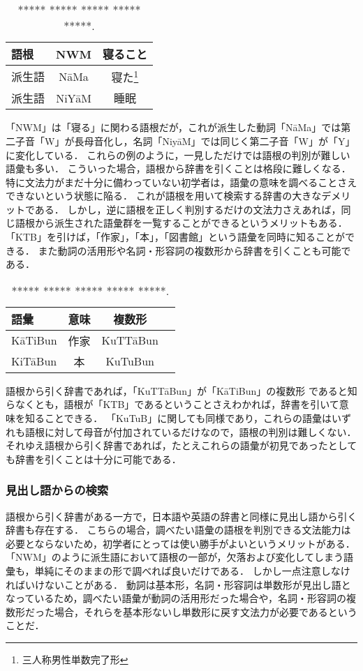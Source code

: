 \documentclass[technicalreport]{ieicej}
\begin{document}
\begin{table}[ht]
\begin{center}
\begin{tabular}{l|cc}
   語根& NWM & 寝ること\\
  \hline
 派生語& NāMa & 寝た\footnote{三人称男性単数完了形}\\
  派生語& NiYāM & 睡眠\\
\hline
\end{tabular}
\caption{***** ***** ***** ***** *****.}
\label{table:alignment}
\end{center}
\end{table}
「NWM」は「寝る」に関わる語根だが，これが派生した動詞「NāMa」では第二子音「W」が長母音化し，名詞「NiyāM」では同じく第二子音「W」が「Y」に変化している．
これらの例のように，一見しただけでは語根の判別が難しい語彙も多い．
こういった場合，語根から辞書を引くことは格段に難しくなる．
特に文法力がまだ十分に備わっていない初学者は，語彙の意味を調べることさえできないという状態に陥る．
これが語根を用いて検索する辞書の大きなデメリットである．
しかし，逆に語根を正しく判別するだけの文法力さえあれば，同じ語根から派生された語彙群を一覧することができるというメリットもある．
「KTB」を引けば，「作家」，「本」，「図書館」という語彙を同時に知ることができる．
また動詞の活用形や名詞・形容詞の複数形から辞書を引くことも可能である．

\begin{table}[ht]
\begin{center}
\begin{tabular}{l|ccc}
   語彙 & 意味 & 複数形\\
  \hline
 KāTiBun & 作家 & KuTTāBun \\
  KiTāBun & 本 & KuTuBun\\
\hline
\end{tabular}
\caption{***** ***** ***** ***** *****.}
\label{table:alignment}
\end{center}
\end{table}
語根から引く辞書であれば，「KuTTāBun」が「KāTiBun」の複数形 であると知らなくとも，語根が「KTB」であるということさえわかれば，辞書を引いて意味を知ることできる．
「KuTuB」に関しても同様であり，これらの語彙はいずれも語根に対して母音が付加されているだけなので，語根の判別は難しくない．
それゆえ語根から引く辞書であれば，たとえこれらの語彙が初見であったとしても辞書を引くことは十分に可能である．

\subsubsection{見出し語からの検索}
語根から引く辞書がある一方で，日本語や英語の辞書と同様に見出し語から引く辞書も存在する．
こちらの場合，調べたい語彙の語根を判別できる文法能力は必要とならないため，初学者にとっては使い勝手がよいというメリットがある．
「NWM」のように派生語において語根の一部が，欠落および変化してしまう語彙も，単純にそのままの形で調べれば良いだけである．
しかし一点注意しなければいけないことがある．
動詞は基本形，名詞・形容詞は単数形が見出し語となっているため，調べたい語彙が動詞の活用形だった場合や，名詞・形容詞の複数形だった場合，それらを基本形ないし単数形に戻す文法力が必要であるということだ．
\end{document}
